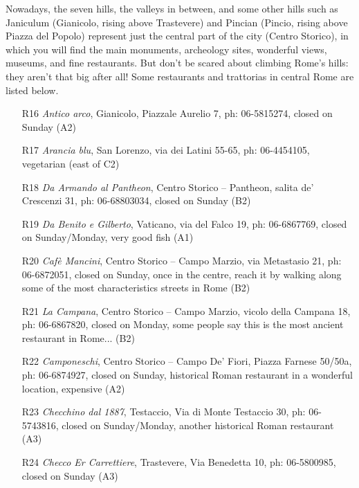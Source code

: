 \documentclass[twocolumn,10pt]{article}
\begin{document}
Nowadays, the seven hills, the valleys in between, and some other 
hills such as Janiculum (Gianicolo, rising above Trastevere) and 
Pincian (Pincio, rising above Piazza del Popolo) represent just the 
central part of the city (Centro Storico), in which you will find the 
main monuments, archeology sites, wonderful views, museums, and fine 
restaurants.  But don't be scared about climbing Rome's hills: they 
aren't that big after all! Some restaurants and trattorias in central 
Rome are listed below.


\begin{enumerate}

\item[R16] {\em Antico arco}, Gianicolo, Piazzale Aurelio 7, ph: 
06-5815274, closed on Sunday (A2)

\item[R17] {\em Arancia blu}, San Lorenzo, via dei Latini 55-65, ph: 
06-4454105, vegetarian  (east of C2)

\item[R18] {\em Da Armando al Pantheon}, Centro Storico -- Pantheon, 
salita de' Crescenzi 31, ph: 06-68803034, closed on Sunday (B2)

\item[R19] {\em Da Benito e Gilberto}, Vaticano, via  del Falco 19, 
ph: 06-6867769, closed on Sunday/Monday, very good fish (A1)

\item[R20] {\em Caf\`e Mancini}, Centro Storico -- Campo Marzio, via  
Metastasio 21, ph: 06-6872051, closed on Sunday, once in the centre, 
reach it by walking along some of the most characteristics streets in 
Rome (B2)

\item[R21] {\em La Campana}, Centro Storico -- Campo Marzio, vicolo 
della Campana 18, ph: 06-6867820, closed on Monday, some people say 
this is the most ancient restaurant in Rome... (B2)

\item[R22] {\em Camponeschi}, Centro Storico -- Campo De' Fiori, 
Piazza Farnese 50/50a, ph: 06-6874927, closed on Sunday, historical 
Roman restaurant in a wonderful location, expensive (A2)

\item[R23] {\em Checchino dal 1887}, Testaccio, Via di Monte 
Testaccio 30, ph: 06-5743816, closed on Sunday/Monday, another 
historical Roman restaurant (A3)

\item[R24] {\em Checco Er Carrettiere}, Trastevere, Via Benedetta 10, 
ph: 06-5800985, closed on Sunday (A3)


\end{enumerate}
\end{document}
